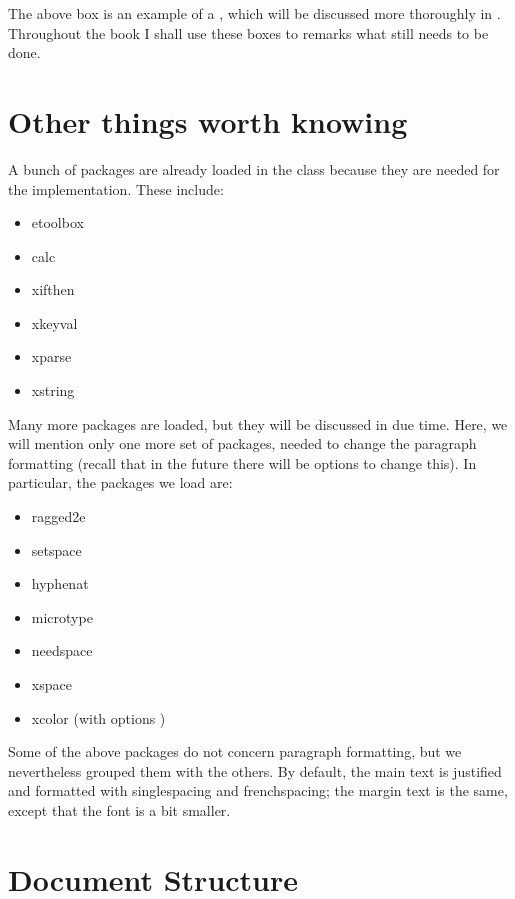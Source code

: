 The above box is an example of a , which will be 
discussed more thoroughly in . Throughout the book I 
shall use these boxes to remarks what still needs to be done.

\section{Other things worth knowing}

A bunch of packages are already loaded in the class because they are 
needed for the implementation. These include:

\begin{itemize}
	\item etoolbox
	\item calc
	\item xifthen
	\item xkeyval
	\item xparse
	\item xstring
\end{itemize}

Many more packages are loaded, but they will be discussed in due time. 
Here, we will mention only one more set of packages, needed to change 
the paragraph formatting (recall that in the future there will be 
options to change this). In particular, the packages we load are:

\begin{itemize}
	\item ragged2e
	\item setspace
	\item hyphenat
	\item microtype
	\item needspace
	\item xspace
	\item xcolor (with options )
\end{itemize}

Some of the above packages do not concern paragraph formatting, but we 
nevertheless grouped them with the others. By default, the main text is 
justified and formatted with singlespacing and frenchspacing; the margin 
text is the same, except that the font is a bit smaller.

\section{Document Structure}

